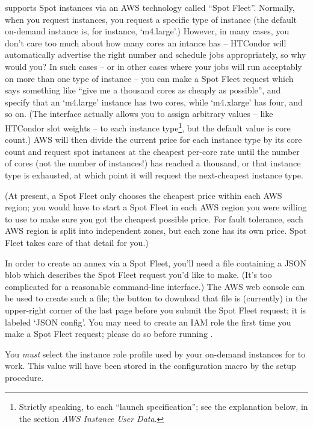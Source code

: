  supports Spot instances via an AWS technology called
``Spot Fleet''.  Normally, when you request instances, you request a specific
type of instance (the default on-demand instance is, for instance, `m4.large'.)
However, in many cases, you don't care too much about how many cores an
intance has -- HTCondor will automatically advertise the right number and
schedule jobs appropriately, so why would you?  In such cases -- or in
other cases where your jobs will run acceptably on more than one type of
instance -- you can make a Spot Fleet request which says something like
``give me a thousand cores as cheaply as possible'', and specify that
an `m4.large' instance has two cores, while `m4.xlarge' has four, and so
on.  (The interface actually allows you to assign arbitrary values --
like HTCondor slot weights -- to each instance
type\footnote{Strictly speaking, to each ``launch specification''; see
the explanation below, in the section \emph{AWS Instance User Data}.},
but the default value is core count.)  AWS will then divide the current price for each
instance type by its core count and request spot instances at the cheapest
per-core rate until the number of cores (not the number of instances!) has
reached a thousand, or that instance type is exhausted, at which point it will
request the next-cheapest instance type.

(At present, a Spot Fleet only chooses the cheapest price within each
AWS region; you would have to start a Spot Fleet in each AWS region you
were willing to use to make sure you got the cheapest possible price.  For
fault tolerance, each AWS region is split into independent zones, but each
zone has its own price.  Spot Fleet takes care of that detail for you.)

In order to create an annex via a Spot Fleet, you'll need a file containing
a JSON blob which describes the Spot Fleet request you'd like to make.  (It's
too complicated for a reasonable command-line interface.)  The AWS web
console can be used to create such a file; the button to download that
file is (currently) in the upper-right corner of the last page before
you submit the Spot Fleet request; it is labeled `JSON config'.  You
may need to create an IAM role the first time you make a Spot Fleet
request; please do so before running .

You \emph{must} select the instance role profile used by your on-demand
instances for  to work.  This value will have been stored in the
configuration macro 
by the setup procedure.


